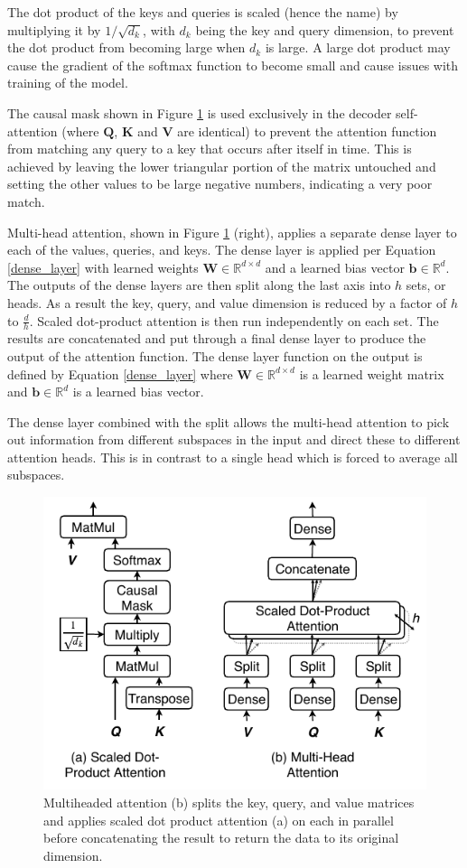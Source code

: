 \documentclass[conference]{IEEEtran}
\begin{document}
The dot product of the keys and queries is scaled (hence the name) by multiplying it by $1 / \sqrt{d_k}$, with $d_k$ being the key and query dimension, to prevent the dot product from becoming large when $d_k$ is large.
A large dot product may cause the gradient of the softmax function to become small and cause issues with training of the model.

The causal mask shown in Figure \ref{fig:multihead} is used exclusively in the decoder self-attention (where $\boldsymbol{Q}$, $\boldsymbol{K}$ and $\boldsymbol{V}$ are identical) to prevent the attention function from matching any query to a key that occurs after itself in time.
This is achieved by leaving the lower triangular portion of the matrix untouched and setting the other values to be large negative numbers, indicating a very poor match.

Multi-head attention, shown in Figure \ref{fig:multihead} (right), applies a separate dense layer to each of the values, queries, and keys. 
The dense layer is applied per Equation \ref{dense_layer} with learned weights $\boldsymbol{W} \in \mathbb{R}^{d \times d}$ and a learned bias vector $\boldsymbol{b} \in \mathbb{R}^{d}$.
The outputs of the dense layers are then split along the last axis into $h$ sets, or heads.
As a result the key, query, and value dimension is reduced by a factor of $h$ to $\frac{d}{h}$.
Scaled dot-product attention is then run independently on each set.
The results are concatenated and put through a final dense layer to produce the output of the attention function.
The dense layer function on the output is defined by Equation \ref{dense_layer} where $\boldsymbol{W} \in \mathbb{R}^{d \times d}$ is a learned weight matrix and $\boldsymbol{b} \in \mathbb{R}^{d}$ is a learned bias vector.

The dense layer combined with the split allows the multi-head attention to pick out information from different subspaces in the input and direct these to different attention heads.
This is in contrast to a single head which is forced to average all subspaces.

\begin{figure}[htbp]
	\centerline{\includegraphics[width=.35\textwidth]{images/multihead_attn.pdf}}
	\caption{Multiheaded attention (b) splits the key, query, and value matrices and applies scaled dot product attention (a) on each in parallel before concatenating the result to return the data to its original dimension.}
	\label{fig:multihead}
\end{figure}
\end{document}
